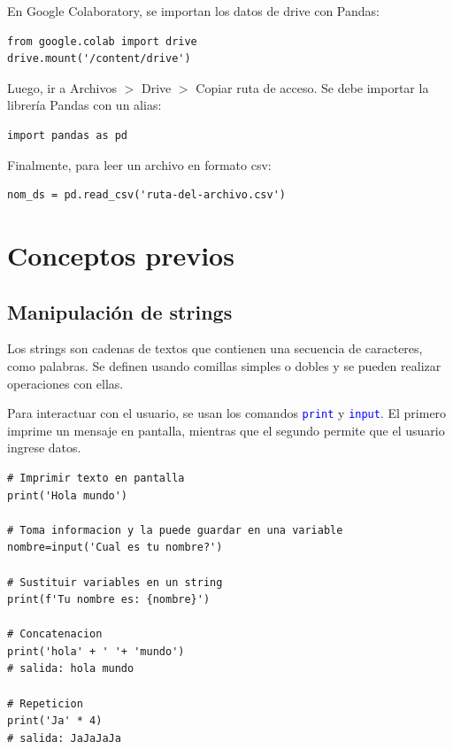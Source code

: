 \documentclass[a4paper, 12pt]{book}
\begin{document}
En Google Colaboratory, se importan los datos de drive con Pandas:
\begin{verbatim}
from google.colab import drive
drive.mount('/content/drive')
\end{verbatim}
Luego, ir a Archivos $>$ Drive $>$ Copiar ruta de acceso. Se debe importar la librería Pandas con un alias:
\begin{verbatim}
import pandas as pd
\end{verbatim}
Finalmente, para leer un archivo en formato csv:
\begin{verbatim}
nom_ds = pd.read_csv('ruta-del-archivo.csv')
\end{verbatim}

\section{Conceptos previos}
\subsection{Manipulación de strings}
Los strings son cadenas de textos que contienen una secuencia de caracteres, como palabras. Se definen usando comillas simples o dobles y se pueden realizar operaciones con ellas.

Para interactuar con el usuario, se usan los comandos \texttt{\textcolor{blue}{print}} y \texttt{\textcolor{blue}{input}}. El primero imprime un mensaje en pantalla, mientras que el segundo permite que el usuario ingrese datos.
\begin{verbatim}
# Imprimir texto en pantalla
print('Hola mundo')
	
# Toma informacion y la puede guardar en una variable
nombre=input('Cual es tu nombre?')
	
# Sustituir variables en un string
print(f'Tu nombre es: {nombre}')

# Concatenacion
print('hola' + ' '+ 'mundo')
# salida: hola mundo
	
# Repeticion
print('Ja' * 4)
# salida: JaJaJaJa
\end{verbatim}
\end{document}
